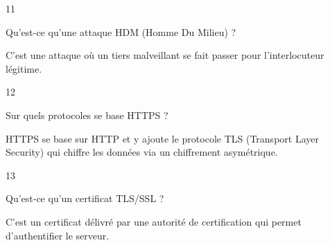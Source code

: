 \begin{taggedblock}{11}
\begin{exoq}
Qu'est-ce qu'une attaque HDM (Homme Du Milieu) ?
\end{exoq} 
\begin{exor}
C'est une attaque où un tiers malveillant se fait passer pour l'interlocuteur légitime. \bqr
\end{exor} 
\end{taggedblock}

\begin{taggedblock}{12}
\begin{exoq}
Sur quels protocoles se base HTTPS ?
\end{exoq} 
\begin{exor}
HTTPS se base sur HTTP et y ajoute le protocole TLS (Transport Layer Security) qui chiffre les données via un chiffrement asymétrique. \bqr
\end{exor} 
\end{taggedblock}

\begin{taggedblock}{13}
\begin{exoq}
Qu'est-ce qu'un certificat TLS/SSL ?
\end{exoq} 
\begin{exor}
C'est un certificat délivré par une autorité de certification qui permet d'authentifier le serveur. \bqr
\end{exor} 
\end{taggedblock}
